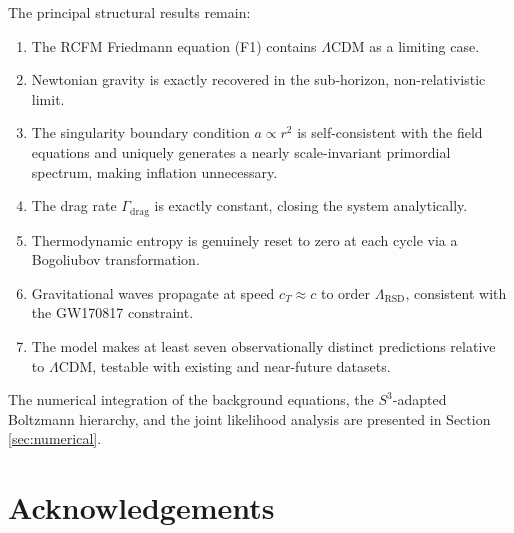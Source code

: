 \documentclass[10pt,twocolumn]{article}
\theoremstyle{definition}
\newcommand{\Gammadrag}{\Gamma_{\mathrm{drag}}}
\begin{document}
The principal structural results remain:
\begin{enumerate}
  \item The RCFM Friedmann equation (F1) contains
    $\Lambda$CDM as a limiting case.
  \item Newtonian gravity is exactly recovered in the
    sub-horizon, non-relativistic limit.
  \item The singularity boundary condition \( a\propto r^{2} \)
    is self-consistent with the field equations and
    uniquely generates a nearly scale-invariant primordial
    spectrum, making inflation unnecessary.
  \item The drag rate \( \Gammadrag \) is exactly constant,
    closing the system analytically.
  \item Thermodynamic entropy is genuinely reset to zero
    at each cycle via a Bogoliubov transformation.
  \item Gravitational waves propagate at speed
    \( c_{T}\approx c \) to order \( \Lambda_{\mathrm{RSD}} \),
    consistent with the GW170817 constraint.
  \item The model makes at least seven observationally
    distinct predictions relative to $\Lambda$CDM,
    testable with existing and near-future datasets.
\end{enumerate}

The numerical integration of the background equations, the \(S^3\)-adapted Boltzmann hierarchy, and the joint likelihood analysis are presented in Section \ref{sec:numerical}.

\section*{Acknowledgements}
\noindent
[To be completed.] 

\newpage


\end{document}
